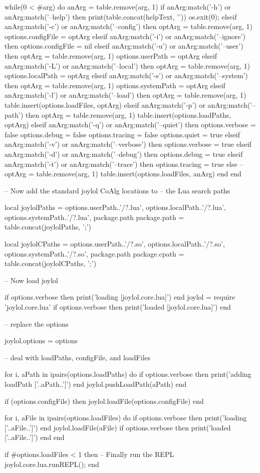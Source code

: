 while(0 < #arg) do
  anArg = table.remove(arg, 1)
  if anArg:match('-h') or anArg:match('--help') then
    print(table.concat(helpText, '\n'))
    os.exit(0);
  elseif anArg:match('-c') or anArg:match('--config') then
    optArg = table.remove(arg, 1)
    options.configFile = optArg
  elseif anArg:match('-i') or anArg:match('--ignore') then
    options.configFile = nil
  elseif anArg:match('-u') or anArg:match('--user') then
    optArg = table.remove(arg, 1)
    options.userPath = optArg
  elseif anArg:match('-L') or anArg:match('--local') then
    optArg = table.remove(arg, 1)
    options.localPath = optArg
  elseif anArg:match('-s') or anArg:match('--system') then
    optArg = table.remove(arg, 1)
    options.systemPath = optArg
  elseif anArg:match('-l') or anArg:match('--load') then
    optArg = table.remove(arg, 1)
    table.insert(options.loadFiles, optArg)
  elseif anArg:match('-p') or anArg:match('--path') then
    optArg = table.remove(arg, 1)
    table.insert(options.loadPaths, optArg)
  elseif anArg:match('-q') or anArg:match('--quiet') then
    options.verbose = false
    options.debug   = false
    options.tracing = false
    options.quiet   = true
  elseif anArg:match('-v') or anArg:match('--verbose') then
    options.verbose = true
  elseif anArg:match('-d') or anArg:match('--debug') then
    options.debug = true
  elseif anArg:match('-t') or anArg:match('--trace') then
    options.tracing = true
  else
    --optArg = table.remove(arg, 1)
    table.insert(options.loadFiles, anArg)
  end
end

-- Now add the standard joylol CoAlg locations to
-- the Lua search paths 

local joylolPaths = {
  options.userPath..'/?.lua',
  options.localPath..'/?.lua',
  options.systemPath..'/?.lua',
  package.path
}
package.path = table.concat(joylolPaths, ';')

local joylolCPaths = {
  options.userPath..'/?.so',
  options.localPath..'/?.so',
  options.systemPath..'/?.so',
  package.path
}
package.cpath = table.concat(joylolCPaths, ';')

-- Now load joylol

if options.verbose then print('loading [joylol.core.lua]') end
joylol = require 'joylol.core.lua'
if options.verbose then print('loaded [joylol.core.lua]\n') end

-- replace the options

joylol.options = options

--  deal with loadPaths, configFile, and loadFiles

for i, aPath in ipairs(options.loadPaths) do
  if options.verbose then print('adding loadPath ['..aPath..']\n') end
  joylol.pushLoadPath(aPath)
end

if (options.configFile) then
  joylol.loadFile(options.configFile)
end

for i, aFile in ipairs(options.loadFiles) do
  if options.verbose then print('loading ['..aFile..']\n') end
  joylol.loadFile(aFile)
  if options.verbose then print('loaded ['..aFile..']\n') end
end

if #options.loadFiles < 1 then
  -- Finally run the REPL
  joylol.core.lua.runREPL();
end

\stopLuaCode
